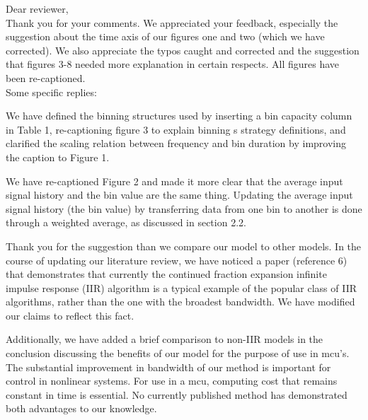\documentclass[11pt]{article}
\begin{document}
\noindent Dear reviewer,\\

Thank you for your comments. We appreciated your feedback, especially the suggestion about the time axis of our figures one and two (which we have corrected). We also appreciate the typos caught and corrected and the suggestion that figures 3-8 needed more explanation in certain respects. All figures have been re-captioned.
\\
\noindent Some specific replies:\\


We have defined the binning structures used by inserting a bin capacity column in Table 1, re-captioning figure 3 to explain binning s
strategy definitions, and clarified the scaling relation between frequency and bin duration by improving the caption to Figure 1. \\


We have re-captioned Figure 2 and made it more clear that the average input signal history and the bin value are the same thing. Updating the average input signal history (the bin value) by transferring data from one bin to another is done through a weighted average, as discussed in section 2.2.\\


Thank you for the suggestion than we compare our model to other models. In the course of updating our literature review, we have noticed a paper (reference 6) that demonstrates that currently the continued fraction expansion infinite impulse response (IIR) algorithm is a typical example of the popular class of IIR algorithms, rather than the one with the broadest bandwidth. We have modified our claims to reflect this fact. 

Additionally, we have added a brief comparison to non-IIR models in the conclusion discussing the benefits of our model for the purpose of use in mcu's. The substantial improvement in bandwidth of our method is important for control in nonlinear systems. For use in a mcu, computing cost that remains constant in time is essential. No currently published method has demonstrated both advantages to our knowledge. \\
\end{document}
